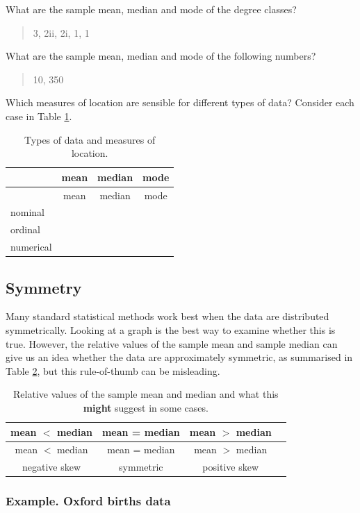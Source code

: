 \documentclass[
  11pt,
  british,
  openany, a4paper]{book}
\begin{document}
What are the sample mean, median and mode of the degree classes?

\begin{quote}
3, 2ii, 2i, 1, 1
\end{quote}

What are the sample mean, median and mode of the following numbers?

\begin{quote}
10, 350
\end{quote}

Which measures of location are sensible for different types of data? Consider each case in Table \ref{tab:whichmeasures}.

\begin{longtable}[]{@{}lccc@{}}
\caption{\label{tab:whichmeasures} Types of data and measures of location.}\tabularnewline
\toprule
& mean & median & mode\tabularnewline
\midrule
\endfirsthead
\toprule
& mean & median & mode\tabularnewline
\midrule
\endhead
nominal & & &\tabularnewline
ordinal & & &\tabularnewline
numerical & & &\tabularnewline
\bottomrule
\end{longtable}

\hypertarget{symmetry}{%
\subsection{Symmetry}\label{symmetry}}

Many standard statistical methods work best when the data are distributed symmetrically. Looking at a graph is the best way to examine whether this is true. However, the relative values of the sample mean and sample median can give us an idea whether the data are approximately symmetric, as summarised in Table \ref{tab:thumb}, but this rule-of-thumb can be misleading.

\begin{longtable}[]{@{}cccc@{}}
\caption{\label{tab:thumb} Relative values of the sample mean and median and what this \textbf{might} suggest in some cases.}\tabularnewline
\toprule
mean \(<\) median & mean = median & mean \(>\) median &\tabularnewline
\midrule
\endfirsthead
\toprule
mean \(<\) median & mean = median & mean \(>\) median &\tabularnewline
\midrule
\endhead
negative skew & symmetric & positive skew &\tabularnewline
\bottomrule
\end{longtable}

\hypertarget{example.-oxford-births-data}{%
\subsubsection*{Example. Oxford births data}\label{example.-oxford-births-data}}
\end{document}
